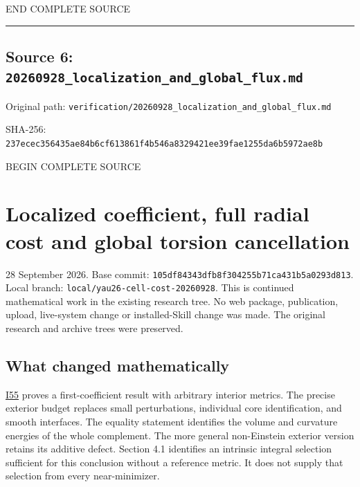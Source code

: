 \documentclass[
  10pt,
]{article}
\begin{document}
END COMPLETE SOURCE

\begin{center}\rule{0.5\linewidth}{0.5pt}\end{center}

\hypertarget{source-6-20260928_localization_and_global_flux.md}{%
\subsection{Source 6:
\nolinkurl{20260928_localization_and_global_flux.md}}\label{source-6-20260928_localization_and_global_flux.md}}

Original path:
\nolinkurl{verification/20260928_localization_and_global_flux.md}

SHA-256:
\nolinkurl{237ecec356435ae84b6cf613861f4b546a8329421ee39fae1255da6b5972ae8b}

BEGIN COMPLETE SOURCE

\hypertarget{localized-coefficient-full-radial-cost-and-global-torsion-cancellation}{%
\section{Localized coefficient, full radial cost and global torsion
cancellation}\label{localized-coefficient-full-radial-cost-and-global-torsion-cancellation}}

28 September 2026. Base commit:
\nolinkurl{105df84343dfb8f304255b71ca431b5a0293d813}. Local branch:
\nolinkurl{local/yau26-cell-cost-20260928}. This is continued mathematical
work in the existing research tree. No web package, publication, upload,
live-system change or installed-Skill change was made. The original
research and archive trees were preserved.

\hypertarget{what-changed-mathematically-1}{%
\subsection{What changed
mathematically}\label{what-changed-mathematically-1}}

\href{../continuation/20260928_localization_and_coupled_filling.md}{I55}
proves a first-coefficient result with arbitrary interior metrics. The
precise exterior budget replaces small perturbations, individual core
identification, and smooth interfaces. The equality statement identifies
the volume and curvature energies of the whole complement. The more
general non-Einstein exterior version retains its additive defect.
Section 4.1 identifies an intrinsic integral selection sufficient for
this conclusion without a reference metric. It does not supply that
selection from every near-minimizer.
\end{document}
